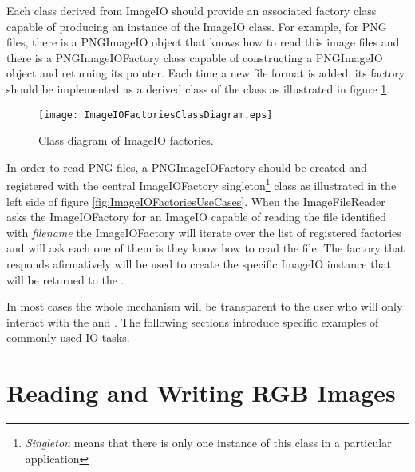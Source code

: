 Each class derived from ImageIO should provide an associated factory class
capable of producing an instance of the ImageIO class. For example, for PNG
files, there is a PNGImageIO object that knows how to read this image files
and there is a PNGImageIOFactory class capable of constructing a PNGImageIO
object and returning its pointer. Each time a new file format is added, its
factory should be implemented as a derived class of the 
class as illustrated in figure \ref{fig:ImageIOFactoriesClassDiagram}. 

\begin{figure}
\center
\texttt{[image: ImageIOFactoriesClassDiagram.eps]}
\caption{Class diagram of ImageIO factories.}
\label{fig:ImageIOFactoriesClassDiagram}
\end{figure}

In order to read PNG files, a PNGImageIOFactory should be created and
registered with the central ImageIOFactory singleton\footnote{\emph{Singleton}
means that there is only one instance of this class in a particular
application} class as illustrated in the left side of figure
\ref{fig:ImageIOFactoriesUseCases}. When the ImageFileReader asks the
ImageIOFactory for an ImageIO capable of reading the file identified with
\emph{filename} the ImageIOFactory will iterate over the list of registered
factories and will ask each one of them is they know how to read the file. The
factory that responds afirmatively will be used to create the specific ImageIO
instance that will be returned to the .

In most cases the whole mechanism will be transparent to the user who will only
interact with the  and . The following
sections introduce specific examples of commonly used IO tasks. 



\section{Reading and Writing RGB Images}
\label{sec:RGBImagReadWrite}





